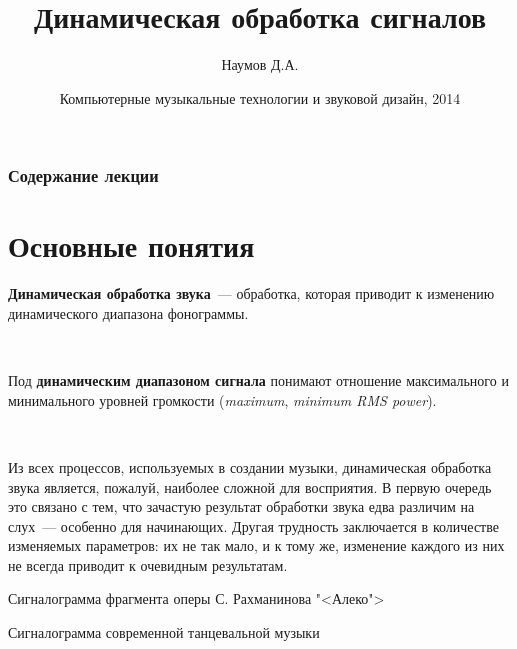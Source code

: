 \documentclass{beamer}
\title{Динамическая обработка сигналов}
\author{Наумов Д.А.}
\date[01.04.2014] {Компьютерные музыкальные технологии и звуковой дизайн, 2014}
\begin{document}
\begin{frame}
  \titlepage
\end{frame}

\begin{frame}
  \frametitle{Содержание лекции}
  \tableofcontents
\end{frame}

\section{Основные понятия}
\begin{frame}
\textbf{Динамическая обработка звука}~--- обработка, которая приводит к изменению динамического диапазона фонограммы.

~

Под \textbf{динамическим диапазоном сигнала} понимают отношение максимального и минимального уровней громкости (\emph{maximum}, \emph{minimum RMS power}).

~

Из всех процессов, используемых в создании музыки, динамическая обработка звука является, пожалуй, наиболее сложной для восприятия. В первую очередь это связано с тем, что зачастую результат обработки звука едва различим на слух~--- особенно для начинающих. Другая трудность заключается в количестве изменяемых параметров: их не так мало, и к тому же, изменение каждого из них не всегда приводит к очевидным результатам.
\end{frame}

\begin{frame}
  \begin{block}{Сигналограмма фрагмента оперы С. Рахманинова "<Алеко">}
  \end{block}
  \begin{block}{Сигналограмма современной танцевальной музыки}
  \end{block}
\end{frame}
\end{document}
